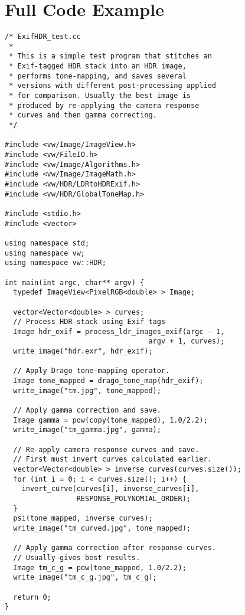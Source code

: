 \section{Full Code Example}
\begin{verbatim}
/* ExifHDR_test.cc
 * 
 * This is a simple test program that stitches an
 * Exif-tagged HDR stack into an HDR image,
 * performs tone-mapping, and saves several
 * versions with different post-processing applied
 * for comparison. Usually the best image is
 * produced by re-applying the camera response
 * curves and then gamma correcting.
 */

#include <vw/Image/ImageView.h>
#include <vw/FileIO.h>
#include <vw/Image/Algorithms.h>
#include <vw/Image/ImageMath.h>
#include <vw/HDR/LDRtoHDRExif.h>
#include <vw/HDR/GlobalToneMap.h>

#include <stdio.h>
#include <vector>

using namespace std;
using namespace vw;
using namespace vw::HDR;

int main(int argc, char** argv) {
  typedef ImageView<PixelRGB<double> > Image;

  vector<Vector<double> > curves;
  // Process HDR stack using Exif tags
  Image hdr_exif = process_ldr_images_exif(argc - 1,
                                  argv + 1, curves);
  write_image("hdr.exr", hdr_exif);

  // Apply Drago tone-mapping operator.
  Image tone_mapped = drago_tone_map(hdr_exif);
  write_image("tm.jpg", tone_mapped);

  // Apply gamma correction and save.
  Image gamma = pow(copy(tone_mapped), 1.0/2.2);
  write_image("tm_gamma.jpg", gamma);

  // Re-apply camera response curves and save.
  // First must invert curves calculated earlier.
  vector<Vector<double> > inverse_curves(curves.size());
  for (int i = 0; i < curves.size(); i++) {
    invert_curve(curves[i], inverse_curves[i],
                 RESPONSE_POLYNOMIAL_ORDER);
  }
  psi(tone_mapped, inverse_curves);
  write_image("tm_curved.jpg", tone_mapped);

  // Apply gamma correction after response curves.
  // Usually gives best results.
  Image tm_c_g = pow(tone_mapped, 1.0/2.2);
  write_image("tm_c_g.jpg", tm_c_g);  

  return 0;
}
\end{verbatim}

